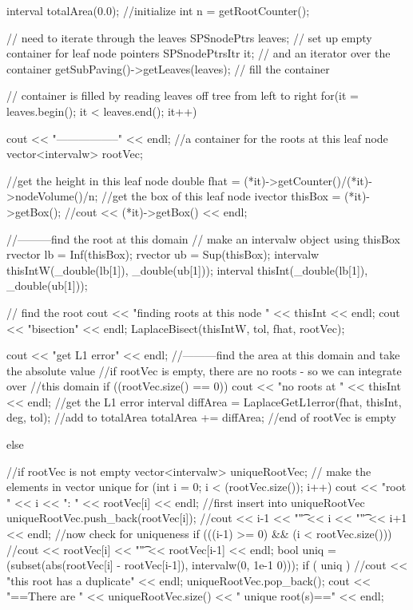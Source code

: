 \begin{DoxyCode}
{
  interval totalArea(0.0); //initialize
  int n = getRootCounter();

  // need to iterate through the leaves
  SPSnodePtrs leaves; // set up empty container for leaf node pointers
  SPSnodePtrsItr it; // and an iterator over the container
  getSubPaving()->getLeaves(leaves); // fill the container
  
  // container is filled by reading leaves off tree from left to right
  for(it = leaves.begin(); it < leaves.end(); it++) {
    cout << "-----------------" << endl;
    //a container for the roots at this leaf node
    vector<intervalw> rootVec;
    
    //get the height in this leaf node
    double fhat = (*it)->getCounter()/(*it)->nodeVolume()/n;
    //get the box of this leaf node
    ivector thisBox = (*it)->getBox();
    //cout << (*it)->getBox() << endl;
    
    //---------find the root at this domain
    // make an intervalw object using thisBox
    rvector lb = Inf(thisBox);
    rvector ub = Sup(thisBox);
    intervalw thisIntW(_double(lb[1]), _double(ub[1]));
    interval thisInt(_double(lb[1]), _double(ub[1]));
    
    // find the root
    cout << "finding roots at this node " << thisInt << endl;
    cout << "bisection" << endl;
    LaplaceBisect(thisIntW, tol, fhat, rootVec); 

    cout << "get L1 error" << endl;
    //---------find the area at this domain and take the absolute value
    //if rootVec is empty, there are no roots - so we can integrate over
    //this domain
    if ((rootVec.size() == 0)) { 
      cout << "no roots at " << thisInt << endl;
      //get the L1 error
      interval diffArea = LaplaceGetL1error(fhat, thisInt, deg, tol);
      //add to totalArea
      totalArea += diffArea;
    } //end of rootVec is empty

    else { //if rootVec is not empty
      vector<intervalw> uniqueRootVec;
      // make the elements in vector unique
      for (int i = 0; i < (rootVec.size()); i++) {
        cout << "root " << i << ": " << rootVec[i] << endl;
        //first insert into uniqueRootVec
        uniqueRootVec.push_back(rootVec[i]);
        //cout << i-1 << "\t" << i << "\t" << i+1 << endl;
        //now check for uniqueness
        if (((i-1) >= 0) && (i < rootVec.size())) {
          //cout << rootVec[i] << "\t" << rootVec[i-1] << endl;
          bool uniq = (subset(abs(rootVec[i] - rootVec[i-1]), intervalw(0, 1e-1
      0)));
          if ( uniq ) { 
            //cout << "this root has a duplicate" << endl;
            uniqueRootVec.pop_back(); }
        }
      }
      cout << "==There are " << uniqueRootVec.size() << " unique root(s)==" << 
      endl;

}}}
\end{DoxyCode}
